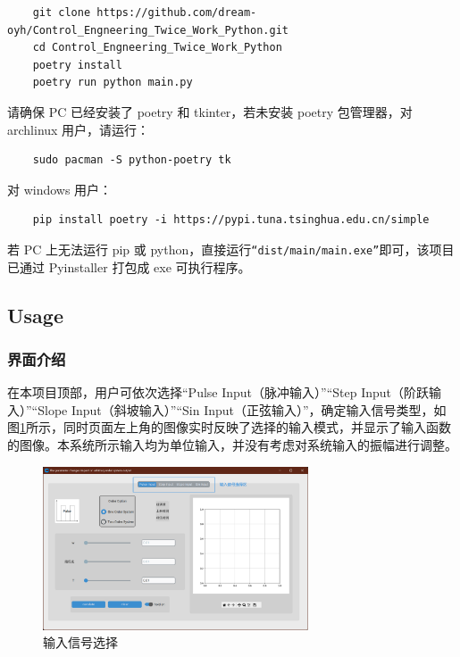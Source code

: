 \documentclass[12pt]{ctexart}
\begin{document}
\begin{lstlisting}
    git clone https://github.com/dream-oyh/Control_Engneering_Twice_Work_Python.git
    cd Control_Engneering_Twice_Work_Python
    poetry install
    poetry run python main.py 
\end{lstlisting}

请确保 PC 已经安装了 poetry 和 tkinter，若未安装 poetry 包管理器，对 archlinux 用户，请运行：

\begin{lstlisting}
    sudo pacman -S python-poetry tk 
\end{lstlisting}

对 windows 用户：

\begin{lstlisting}
    pip install poetry -i https://pypi.tuna.tsinghua.edu.cn/simple
\end{lstlisting}

若 PC 上无法运行 pip 或 python，直接运行\texttt{“dist/main/main.exe”}即可，该项目已通过 Pyinstaller 打包成 exe 可执行程序。

\subsection{Usage}

\subsubsection{界面介绍}

在本项目顶部，用户可依次选择“Pulse Input（脉冲输入）”“Step Input（阶跃输入）”“Slope Input（斜坡输入）”“Sin Input（正弦输入）”，确定输入信号类型，如图\ref{figure4}所示，同时页面左上角的图像实时反映了选择的输入模式，并显示了输入函数的图像。本系统所示输入均为单位输入，并没有考虑对系统输入的振幅进行调整。

\begin{figure}
    \centering
    \includegraphics[width=0.7\textwidth]{img/input_signal_choose.png}
    \caption{输入信号选择}\label{figure4}
\end{figure}
\end{document}
